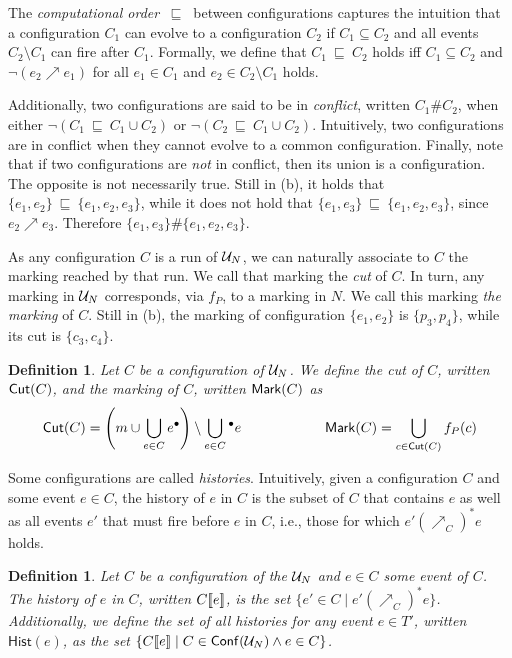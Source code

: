 \documentclass[11pt,a4paper]{article}
\newtheorem{definition}[theorem]{Definition}
\newcommand{\hist}[1]{\ensuremath{\mathsf{Hist}(#1)}}
\newcommand{\conf}[1]{\ensuremath{\mathsf{Conf}(#1)}}
\newcommand{\confl}{\ensuremath{\mathord{\#}}}
\newcommand{\evolves}{{\ensuremath{\ \sqsubseteq \ }}}
\begin{document}
\label{pag:evolves} The \emph{computational order} $\evolves$ between
configurations captures the intuition that a configuration $C_1$ can evolve to
a configuration $C_2$ if $C_1 \subseteq C_2$ and all events $C_2 \setminus C_1$
can fire after $C_1$.  Formally, we define that $C_1 \evolves C_2$ holds
iff $C_1 \subseteq C_2$ and $\lnot (e_2 \nearrow e_1)$ for all $e_1 \in C_1$
and $e_2 \in C_2 \setminus C_1$ holds.

\label{pag:conflict} Additionally, two configurations are said to be in
\emph{conflict}, written $C_1 \confl C_2$, when either $\lnot (C_1 \evolves C_1
\cup C_2)$ or $\lnot (C_2 \evolves C_1 \cup C_2)$.  Intuitively, two
configurations are in conflict when they cannot evolve to a common
configuration.  Finally, note that if two configurations are \emph{not} in
conflict, then its union is a configuration.  The opposite is not necessarily
true.  Still in  (b), it holds that $\{e_1, e_2\} \evolves \{e_1,
e_2, e_3\}$, while it does not hold that $\{e_1, e_3\} \evolves \{e_1, e_2,
e_3\}$, since $e_2 \nearrow e_3$.  Therefore $\{e_1, e_3\} \confl \{e_1, e_2,
e_3\}$.

As any configuration $C$ is a run of $\mathcal{U}_{N}$, we can naturally associate to
$C$ the marking reached by that run.  We call that marking the \emph{cut} of
$C$.  In turn, any marking in $\mathcal{U}_{N}$ corresponds, via $f_P$, to a marking in
$N$.  We call this marking \emph{the marking} of $C$.  Still in 
(b), the marking of configuration $\{e_1, e_2\}$ is $\{p_3, p_4\}$, while its
cut is $\{c_3, c_4\}$.

\begin{definition}
Let $C$ be a configuration of $\mathcal{U}_{N}$.  We define the \emph{cut} of $C$,
written $\mathsf{Cut }{(C)}$, and the \emph{marking} of $C$, written $\mathsf{Mark }{(C)}$ as $$\mathsf{Cut }{(C)} = \left ( m \cup \bigcup_{e \in C} e^\bullet \right ) \setminus \bigcup_{e \in
C} {}^\bullet e \qquad \qquad \qquad \mathsf{Mark }{(C)} = \bigcup_{c \in \mathsf{Cut }{(C)}} f_P (c)$$
\end{definition}

Some configurations are called \emph{histories}.  Intuitively, given a
configuration $C$ and some event $e \in C$, the history of $e$ in $C$ is the
subset of $C$ that contains $e$ as well as all events $e'$ that must fire
before $e$ in $C$, i.e., those for which $e' (\nearrow_C)^* e$ holds.

\begin{definition}
\label{def:history}
Let $C$ be a configuration of the $\mathcal{U}_{N}$ and $e \in C$ some event of $C$.
The \emph{history} of $e$ in $C$, written $C [\![ e]\!]$, is the set $\{e' \in C
\mid e' (\nearrow_C)^* e\}$.  Additionally, we define the set of all histories
for any event $e \in T'$, written $\hist e$, as the set $\{C \sem e \mid C \in
\conf{\unf N} \land e \in C\}$.
\end{definition}
\end{document}
